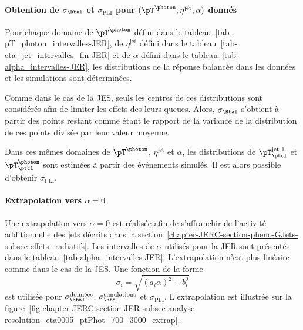 \paragraph{Obtention de $\sigma_\Rbal$ et $\sigma_\text{PLI}$ pour $(\pT^{\photon}, \eta^\text{jet}, \alpha)$ donnés}
Pour chaque domaine
de $\pT^{\photon}$ défini dans le tableau~\ref{tab-pT_photon_intervalles-JER},
de $\eta^\text{jet}$ défini dans le tableau~\ref{tab-eta_jet_intervalles_fin-JER} et
de $\alpha$ défini dans le tableau~\ref{tab-alpha_intervalles-JER},
les distributions de la réponse balancée dans les données et les simulations sont déterminées.
\par Comme dans le cas de la JES, seuls les centres de ces distributions sont considérés afin de limiter les effets des leurs queues.
Alors, $\sigma_{\Rbal}$ s'obtient à partir des points restant comme étant le rapport de la variance de la distribution de ces points divisée par leur valeur moyenne.
\par
Dans ces mêmes domaines de $\pT^{\photon}$, $\eta^\text{jet}$ et $\alpha$, les distributions de $\pT^\text{jet 1}_\ptcl$ et $\pT^{\photon}_\ptcl$ sont estimées à partir des événements simulés.
Il est alors possible d'obtenir $\sigma_\text{PLI}$.
\paragraph{Extrapolation vers $\alpha=0$}
Une extrapolation vers $\alpha=0$ est réalisée afin de s'affranchir de l'activité additionnelle des jets décrits dans la section~\ref{chapter-JERC-section-pheno-GJets-subsec-effets_radiatifs}.
Les intervalles de $\alpha$ utilisés pour la JER sont présentés dans le tableau~\ref{tab-alpha_intervalles-JER}.
L'extrapolation n'est plus linéaire comme dans le cas de la JES.
Une fonction de la forme
\begin{equation}
\sigma_i = \sqrt{(a_i\alpha)^2+b_i^2}
\end{equation}
est utilisée pour $\sigma_\Rbal^\text{données}$, $\sigma_\Rbal^\text{simulations}$ et $\sigma_\text{PLI}$.
L'extrapolation est illustrée sur la figure~\ref{fig-chapter-JERC-section-JER-subsec-analyse-resolution_eta0005_ptPhot_700_3000_extrap}.
